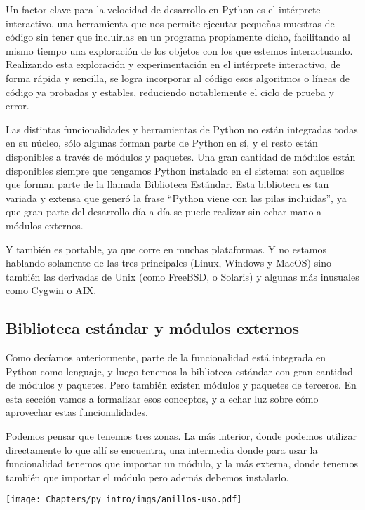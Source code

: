 Un factor clave para la velocidad de desarrollo en Python es el intérprete interactivo, una herramienta que nos permite ejecutar pequeñas muestras de código sin tener que incluirlas en un programa propiamente dicho, facilitando al mismo tiempo una exploración de los objetos con los que estemos interactuando. Realizando esta exploración y experimentación en el intérprete interactivo, de forma rápida y sencilla, se logra incorporar al código esos algoritmos o líneas de código ya probadas y estables, reduciendo notablemente el ciclo de prueba y error.

Las distintas funcionalidades y herramientas de Python no están integradas todas en su núcleo, sólo algunas forman parte de Python en sí, y el resto están disponibles a través de módulos y paquetes. Una gran cantidad de módulos están disponibles siempre que tengamos Python instalado en el sistema: son aquellos que forman parte de la llamada Biblioteca Estándar. Esta biblioteca es tan variada y extensa que generó la frase ``Python viene con las pilas incluidas'', ya que gran parte del desarrollo día a día se puede realizar sin echar mano a módulos externos.

Y también es portable, ya que corre en muchas plataformas. Y no estamos hablando solamente de las tres principales (Linux, Windows y MacOS) sino también las derivadas de Unix (como FreeBSD, o Solaris) y algunas más inusuales como Cygwin o AIX.


\subsection{Biblioteca estándar y módulos externos}\label{intro--stdlib-y-modulos}

Como decíamos anteriormente, parte de la funcionalidad está integrada en Python como lenguaje, y luego tenemos la biblioteca estándar con gran cantidad de módulos y paquetes. Pero también existen módulos y paquetes de terceros. En esta sección vamos a formalizar esos conceptos, y a echar luz sobre cómo aprovechar estas funcionalidades.

Podemos pensar que tenemos tres zonas. La más interior, donde podemos utilizar directamente lo que allí se encuentra, una intermedia donde para usar la funcionalidad tenemos que importar un módulo, y la más externa, donde tenemos también que importar el módulo pero además debemos instalarlo.

\begin{center}
    \texttt{[image: Chapters/py\_intro/imgs/anillos-uso.pdf]}
\end{center}


